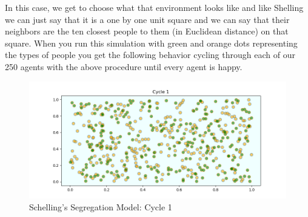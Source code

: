 \documentclass[12pt,twoside]{reedthesis}
\begin{document}
In this case, we get to choose what that environment looks like and like Shelling we can just say that it is a one by one unit square and we can say that their neighbors are the ten closest people to them (in Euclidean distance) on that square. When you run this simulation with green and orange dots representing the types of people you get the following behavior cycling through each of our 250 agents with the above procedure until every agent is happy.

\begin{figure}[h!]
	\centering
	\includegraphics[scale=0.5]{Figures/segregation_1}
	\caption{Schelling's Segregation Model: Cycle 1}
	\label{SSM1_ch1}
\end{figure}
\end{document}
